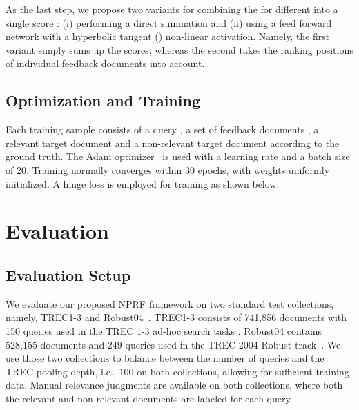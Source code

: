 \documentclass[11pt,a4paper]{article}
\begin{document}
As the last step, we propose two variants
for combining the  for different  into a single score :
(i) performing a direct summation and (ii) using a feed forward network with a hyperbolic tangent ()
non-linear activation.
Namely,
the first variant simply sums up the scores, whereas the second
takes the ranking positions of individual feedback documents into account. 

\vspace{\vignore}
\subsection{Optimization and Training}
\vspace{\vignore}
Each training sample consists of a query , a set of  feedback documents , 
a relevant target document  and a non-relevant target document 
according to the ground truth.
The Adam optimizer~\cite{adam} is used with a learning rate  and a batch size of 20. Training normally converges within 30 epochs, with weights uniformly initialized.
A hinge loss is employed for training 
as shown below.




 \vspace{\vignore}
\section{Evaluation}\label{sec.evaluation}
\vspace{\vignore}
\subsection{Evaluation Setup}\label{sec.evalsetup}
\vspace{\vignore}

We evaluate our proposed NPRF framework on two standard test collections, namely, \textsc{TREC}1-3 \cite{DBLP:conf/sigir/Harman93} and Robust04~\cite{DBLP:conf/trec/Voorhees04b}. TREC1-3 consists of 741,856 documents with 150 queries used in the TREC 1-3 ad-hoc search tasks \cite{DBLP:conf/sigir/Harman93,DBLP:conf/trec/Harman94,DBLP:journals/ipm/Harman95a}. Robust04 contains 528,155 documents and 249 queries used in the TREC 2004 Robust track~\cite{DBLP:conf/trec/Voorhees04b}. We use those two collections to balance between the number of queries and the TREC pooling depth, i.e., 100 on both collections, allowing for sufficient training data. Manual relevance judgments are available on both collections, where both the relevant and non-relevant documents are labeled for each query. 
\end{document}
